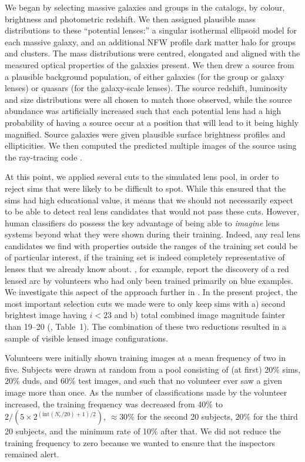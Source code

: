 \documentclass[useAMS,usenatbib,a4paper]{mn2e}
\begin{document}
We began by selecting massive galaxies and groups in the \cfhtls catalogs,
by colour, brightness and photometric redshift. We then assigned plausible mass
distributions to these ``potential lenses:'' a singular isothermal ellipsoid
model for each massive galaxy, and an additional NFW profile dark matter halo
for groups and clusters. The mass distributions were centred, elongated and
aligned with the measured optical properties of the galaxies present. We then
drew a source from a plausible background population, of either galaxies (for
the group or galaxy lenses) or quasars (for the galaxy-scale lenses). The
source redshift, luminosity and size distributions were all chosen to match
those observed, while the source abundance was artificially increased such that
each potential lens had a high probability of having a source occur at a
position that will lead to it being highly magnified. Source galaxies were
given plausible surface brightness profiles and ellipticities. We then computed
the predicted multiple images of the source using the \gravlens ray-tracing
code \citep{Keeton2000}.

At this point, we applied several cuts to the simulated lens pool, in order to
reject sims that were likely to be difficult to spot. While this ensured
that the sims had high educational value, it means that we
should not necessarily expect to be able to
detect real lens candidates that would not pass these cuts.
However, human classifiers do possess the key advantage of being
able to {\it imagine} lens systems beyond what they were shown during their training.
Indeed, any real lens candidates we find with
properties outside the ranges of the training set could be of particular
interest, if the training set is indeed completely representative of lenses that
we already know about.
\citet{GeachEtal2015}, for example, report the discovery of a
red lensed arc  by volunteers who had only been trained primarily on blue
examples. We investigate this aspect of the \SW approach further in \PaperTwo.
In the present project, the most important selection cuts we made were to only
keep sims with a) second brightest image having $i < 23$ and b) total
combined image magnitude fainter than 19--20 (\PaperTwo, Table~1). The
combination of these two reductions resulted in a sample of visible lensed image
configurations.

Volunteers were initially shown training images at
a mean frequency of two in five. Subjects were drawn at random from a pool
consisting of (at first) 20\% sims, 20\% duds, and 60\% test images,
and such that no volunteer ever
saw a given image more than once. As the number of classifications made by the
volunteer increased, the training frequency was decreased from 40\% to
$2/(5\times2^{(\textrm{int}(N_c/20)+1)/2})$, $\approx 30\%$ for the second 20
subjects, $20\%$ for the third 20 subjects, and the minimum rate of 10\%
after that. We did not reduce the training frequency to zero because we wanted
to ensure that the inspectors remained alert.
\end{document}
